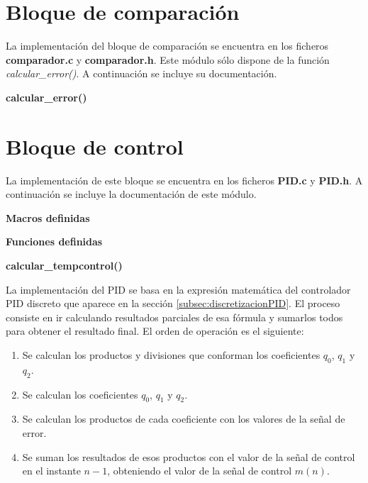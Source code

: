 \section{Bloque de comparación}\label{implementacion:comparacion}

	La implementación del bloque de comparación se encuentra en los ficheros \textbf{comparador.c} y \textbf{comparador.h}. Este módulo sólo dispone de la función \textit{calcular\_error()}. A continuación se incluye su documentación.

\textbf{calcular\_error()}\label{comparacion:calcularError}


\section{Bloque de control}\label{implementacion:control}

	La implementación de este bloque se encuentra en los ficheros \textbf{PID.c} y \textbf{PID.h}. A continuación se incluye la documentación de este módulo.

\noindent\Large\textbf{Macros definidas}\label{control:macros}



\noindent\Large\textbf{Funciones definidas}\label{control:funciones}

\normalsize\textbf{calcular\_tempcontrol()}\label{control:calcularTempControl}



	La implementación del PID se basa en la expresión matemática del controlador PID discreto que aparece en la sección \ref{subsec:discretizacionPID}. El proceso consiste en ir calculando resultados parciales de esa fórmula y sumarlos todos para obtener el resultado final. El orden de operación es el siguiente:

\begin{enumerate}  
\addtolength{\itemsep}{-1mm}
\item Se calculan los productos y divisiones que conforman los coeficientes $q_{0}$, $q_{1}$ y $q_{2}$.
\item Se calculan los coeficientes $q_{0}$, $q_{1}$ y $q_{2}$.
\item Se calculan los productos de cada coeficiente con los valores de la señal de error.
\item Se suman los resultados de esos productos con el valor de la señal de control en el instante $n-1$, obteniendo el valor de la señal de control $m(n)$.
\end{enumerate}

